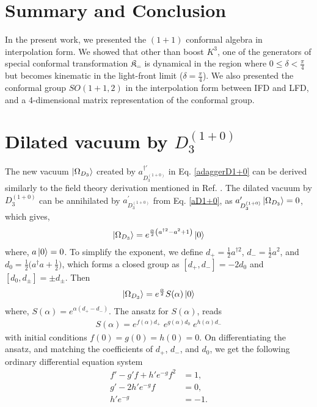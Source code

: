 \documentclass[%
 reprint,
superscriptaddress,
 amsmath,amssymb,
 aps,
]{revtex4-2}
\begin{document}
\section{Summary and Conclusion}
In the present work, we presented the $(1+1)$ conformal algebra in interpolation form. We showed that other than boost $K^{3}$, one of the generators of special conformal transformation $\mathfrak{K}_{\hat{-}}$ is dynamical in the region where $0\leq\delta<\frac{\pi}{4}$ but becomes kinematic in the light-front limit ($\delta=\frac{\pi}{4}$). We also presented the conformal group $SO(1+1,2)$ in the interpolation form between IFD and LFD, and a 4-dimensional matrix representation of the conformal group.


\acknowledgments

\appendix

\section{Dilated vacuum by $D_{3}^{(1+0)}$} 
\label{Dilated-vacuum}
The new vacuum $\ket{\Omega_{D_{3}}}$ created by $a^{\dagger\prime}_{D^{(1+0)}_{3}}$ in Eq. \ref{adaggerD1+0} can be derived similarly to the field theory derivation mentioned in Ref. \cite{umezawa1982thermo}. The dilated vacuum by $D_{3}^{(1+0)}$ can be annihilated by $a^{\prime}_{D^{(1+0)}_{3}}$ from Eq. \ref{aD1+0}, as $ a^{\prime}_{D^{(1+0)}_{3}}\ket{\Omega_{D_{3}}}=0$, which gives, 
\begin{align}
    \ket{\Omega_{D_{3}}}=e^{\frac{\alpha}{2}\left(a^{\dagger 2} - a^2+1\right)}\ket{0}
\end{align}
where, $a\ket{0}=0$. To simplify the exponent, we define $d_{+}=\frac12 a^{\dagger2}$, $d_{-}=\frac12 a^{2}$, and $d_{0}=\frac12\bigl(a^{\dagger}a+\tfrac12\bigr)$, which forms a closed group as $[d_{+},d_{-}]=-2d_{0}$ and $[d_{0},d_{\pm}]=\pm d_{\pm}$. Then
\begin{align}
    \ket{\Omega_{D_{3}}}=e^{\frac{\alpha}{2}}S(\alpha)\ket{0}
\end{align}
where, $S(\alpha)=e^{\alpha(d_{+}-d_{-})}$. The ansatz for $S(\alpha)$, reads
\begin{align}
S(\alpha)=e^{f(\alpha)d_{+}}\;e^{g(\alpha)d_{0}}\;e^{h(\alpha)d_{-}}
\end{align}
with initial conditions $f(0)=g(0)=h(0)=0$. On differentiating the ansatz, and matching the coefficients of $d_{+}$, $d_{-}$, and $d_{0}$, we get the following ordinary differential equation system
\begin{align}
f'-g'f+h'e^{-g}f^{2}&=1,\\
g'-2h'e^{-g}f&=0,\\
h'e^{-g}&=-1.
\end{align}
\end{document}
